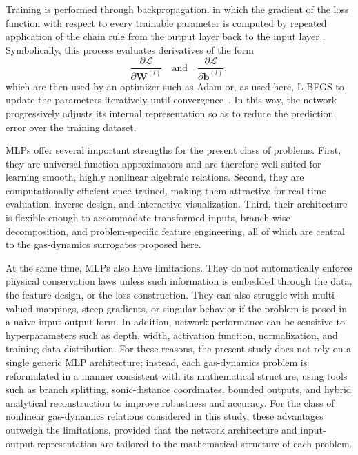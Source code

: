\documentclass[preprint,12pt]{elsarticle}
\begin{document}
Training is performed through backpropagation, in which the gradient of the loss function with respect to every trainable parameter is computed by repeated application of the chain rule from the output layer back to the input layer \cite{Goodfellow}. Symbolically, this process evaluates derivatives of the form
\begin{equation}
\frac{\partial \mathcal{L}}{\partial \mathbf{W}^{(l)}} \quad \text{and} \quad \frac{\partial \mathcal{L}}{\partial \mathbf{b}^{(l)}},
\end{equation}
which are then used by an optimizer such as Adam or, as used here, L-BFGS to update the parameters iteratively until convergence~\cite{Adam}. In this way, the network progressively adjusts its internal representation so as to reduce the prediction error over the training dataset.

MLPs offer several important strengths for the present class of problems. First, they are universal function approximators and are therefore well suited for learning smooth, highly nonlinear algebraic relations. Second, they are computationally efficient once trained, making them attractive for real-time evaluation, inverse design, and interactive visualization. Third, their architecture is flexible enough to accommodate transformed inputs, branch-wise decomposition, and problem-specific feature engineering, all of which are central to the gas-dynamics surrogates proposed here.

At the same time, MLPs also have limitations. They do not automatically enforce physical conservation laws unless such information is embedded through the data, the feature design, or the loss construction. They can also struggle with multi-valued mappings, steep gradients, or singular behavior if the problem is posed in a naive input-output form. In addition, network performance can be sensitive to hyperparameters such as depth, width, activation function, normalization, and training data distribution. For these reasons, the present study does not rely on a single generic MLP architecture; instead, each gas-dynamics problem is reformulated in a manner consistent with its mathematical structure, using tools such as branch splitting, sonic-distance coordinates, bounded outputs, and hybrid analytical reconstruction to improve robustness and accuracy.
For the class of nonlinear gas-dynamics relations considered in this study, these advantages outweigh the limitations, provided that the network architecture and input-output representation are tailored to the mathematical structure of each problem.
\end{document}
